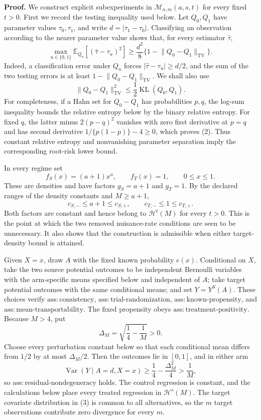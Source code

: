 \textbf{Proof.}
We construct explicit subexperiments in \(\mathcal M_{n,m}(a,s,t)\) for every fixed \(t>0\).  First we record the testing inequality used below.  Let \(Q_0,Q_1\) have parameter values \(\tau_0,\tau_1\), and write \(d=|\tau_1-\tau_0|\).  Classifying an observation according to the nearer parameter value shows that, for every estimator \(\widehat\tau\),
\[
 \max_{u\in\{0,1\}}\mathbb E_{Q_u}
       [ (\widehat\tau-\tau_u)^2 ]
 \ge \frac{d^2}{8}
       \{1-\lVert Q_0-Q_1\rVert_{\mathrm{TV}}\}.
\tag{1}
\]
Indeed, a classification error under \(Q_u\) forces \(|\widehat\tau-\tau_u|\ge d/2\), and the sum of the two testing errors is at least \(1-\lVert Q_0-Q_1\rVert_{\mathrm{TV}}\).  We shall also use
\[
 \lVert Q_0-Q_1\rVert_{\mathrm{TV}}^2
 \le \frac12\operatorname{KL}(Q_0,Q_1).
\tag{2}
\]
For completeness, if a Hahn set for \(Q_0-Q_1\) has probabilities \(p,q\), the log-sum inequality bounds the relative entropy below by the binary relative entropy.  For fixed \(q\), the latter minus \(2(p-q)^2\) vanishes with zero first derivative at \(p=q\) and has second derivative \(1/\{p(1-p)\}-4\ge0\), which proves (2).  Thus constant relative entropy and nonvanishing parameter separation imply the corresponding root-risk lower bound.

In every regime set
\[
 f_S(x)=(a+1)x^a,
 \qquad f_T(x)=1,
 \qquad 0\le x\le1.
\tag{3}
\]
These are densities and have factors \(g_S=a+1\) and \(g_T=1\).  By the declared ranges of the density constants and \(M\ge a+1\),
\[
 c_{S,-}\le a+1\le c_{S,+},
 \qquad c_{T,-}\le1\le c_{T,+}.
\tag{4}
\]
Both factors are constant and hence belong to \(\mathcal H^t(M)\) for every \(t>0\).  This is the point at which the two removed nuisance-rate conditions are seen to be unnecessary.  It also shows that the construction is admissible when either target-density bound is attained.

Given \(X=x\), draw \(A\) with the fixed known probability \(e(x)\).  Conditional on \(X\), take the two source potential outcomes to be independent Bernoulli variables with the arm-specific means specified below and independent of \(A\); take target potential outcomes with the same conditional means; and set \(Y=Y^S(A)\).  These choices verify \(\mathrm{ass:consistency}\), \(\mathrm{ass:trial\text{-}randomization}\), \(\mathrm{ass:known\text{-}propensity}\), and \(\mathrm{ass:mean\text{-}transportability}\).  The fixed propensity obeys \(\mathrm{ass:treatment\text{-}positivity}\).  Because \(M>4\), put
\[
 \Delta_M=\sqrt{\frac14-\frac1M}>0.
\]
Choose every perturbation constant below so that each conditional mean differs from \(1/2\) by at most \(\Delta_M/2\).  Then the outcomes lie in \([0,1]\), and in either arm
\[
 \operatorname{Var}(Y\mid A=d,X=x)
 \ge \frac14-\frac{\Delta_M^2}{4}
 >\frac1M,
\tag{5}
\]
so \(\mathrm{ass:residual\text{-}nondegeneracy}\) holds.  The control regression is constant, and the calculations below place every treated regression in \(\mathcal H^s(M)\).  The target covariate distribution in (3) is common to all alternatives, so the \(m\) target observations contribute zero divergence for every \(m\).

